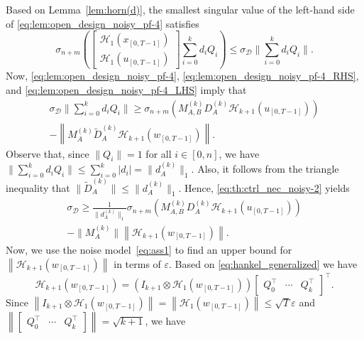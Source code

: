 \documentclass[journal,twoside,web]{ieeecolor}
\newcommand{\norm}[1]{\left\|#1\right\|}
\begin{document}
Based on Lemma~\ref{lem:horn(d)}, the smallest singular value of the left-hand side of \eqref{eq:lem:open_design_noisy_pf-4} satisfies
\begin{equation}
\label{eq:lem:open_design_noisy_pf-4_LHS}
\sigma_{n+m}\left(\begin{bmatrix}
\mathcal{H}_{1}(x_{[0,T-1]}) \\ \mathcal{H}_{1}(u_{[0,T-1]})
\end{bmatrix}\sum_{i=0}^{k}d_iQ_i\right)\leq \sigma_\mathcal{D}\bigg\|\sum_{i=0}^{k}d_iQ_i\bigg\|.
\end{equation}
Now, \eqref{eq:lem:open_design_noisy_pf-4}, \eqref{eq:lem:open_design_noisy_pf-4_RHS}, and \eqref{eq:lem:open_design_noisy_pf-4_LHS} imply that
\begin{equation}
\label{eq:th:ctrl_nec_noisy-2}
\begin{split}
\sigma_\mathcal{D}\bigg\|\sum_{i=0}^{k}d_iQ_i\bigg\|\geq\sigma_{n+m}(M_{A,B}^{(k)}D_A^{(k)}\mathcal{H}_{k+1}(u_{[0,T-1]}))\\
-\norm{M_{A}^{(k)}\tilde{D}_A^{(k)}\mathcal{H}_{k+1}(w_{[0,T-1]})}.
\end{split}
\end{equation}
Observe that, since $\|Q_i\|=1$ for all $i\in[0,n]$, we have $\|\sum_{i=0}^{k}d_iQ_i\|\leq \sum_{i=0}^{k}|d_i|=\|d_A^{(k)}\|_1$. Also, it follows from the triangle inequality that $\|\tilde{D}_A^{(k)}\|\leq\|d_A^{(k)}\|_1$. Hence, \eqref{eq:th:ctrl_nec_noisy-2} yields
\begin{equation}
\label{eq:th:ctrl_nec_noisy-3}
\begin{split}
\sigma_\mathcal{D}\geq\tfrac{1}{\|d_A^{(k)}\|_1}\sigma_{n+m}(M_{A,B}^{(k)}D_A^{(k)}\mathcal{H}_{k+1}(u_{[0,T-1]})) \\
-\|M_{A}^{(k)}\|\norm{\mathcal{H}_{k+1}(w_{[0,T-1]})}.
\end{split}
\end{equation}
Now, we use the noise model~\eqref{eq:ass1} to find an upper bound for $\norm{\mathcal{H}_{k+1}(w_{[0,T-1]})}$ in terms of $\varepsilon$. Based on \eqref{eq:hankel_generalized} we have
\begin{equation}
\mathcal{H}_{k+1}(w_{[0,T-1]})=(I_{{k+1}}\otimes \mathcal{H}_1(w_{[0,T-1]}))\begin{bmatrix}
Q_0^\top \!&\! \cdots \!&\! Q_{k}^\top
\end{bmatrix}^\top.
\end{equation}
Since $\norm{I_{k+1}\otimes \mathcal{H}_1(w_{[0,T-1]})}=\norm{\mathcal{H}_1(w_{[0,T-1]})}\leq\sqrt{T}\varepsilon$ and  $\norm{\begin{bmatrix}
Q_0^\top & \cdots & Q_{k}^\top
\end{bmatrix}}=\sqrt{k+1}$, we have 
\end{document}
